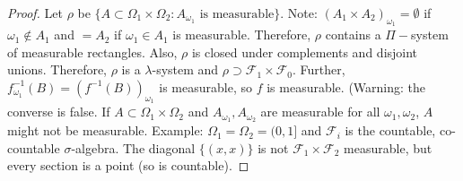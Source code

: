 \documentclass[12pt]{article}
\begin{document}
\begin{proof}
Let $\rho$ be $\{A \subset \Omega_1 \times \Omega_2 : A_{\omega_1} \textrm{ is measurable} \}$.  Note: $(A_1 \times A_2)_{\omega_1} = \emptyset$ if $\omega_1 \not\in A_1$ and $= A_2$ if $\omega_1 \in A_1$ is measurable.  Therefore, $\rho$ contains a $\Pi-$system of measurable rectangles.  Also, $\rho$ is closed under complements and disjoint unions.  Therefore, $\rho$ is a $\lambda$-system and $\rho \supset \mathcal{F}_1 \times \mathcal{F}_0$.  Further, $f_{\omega_1}^{-1}(B) = (f^{-1}(B))_{\omega_1}$ is measurable, so $f$ is measurable.  (Warning: the converse is false.  If $A \subset \Omega_1 \times \Omega_2$ and $A_{\omega_1}, A_{\omega_2}$ are measurable for all $\omega_1, \omega_2$, $A$ might not be measurable.  Example: $\Omega_1 = \Omega_2 = (0, 1]$ and $\mathcal{F}_i$ is the countable, co-countable $\sigma$-algebra.  The diagonal $\{(x, x)\}$ is not $\mathcal{F}_1 \times \mathcal{F}_2$ measurable, but every section is a point (so is countable).

\end{proof}
\end{document}

